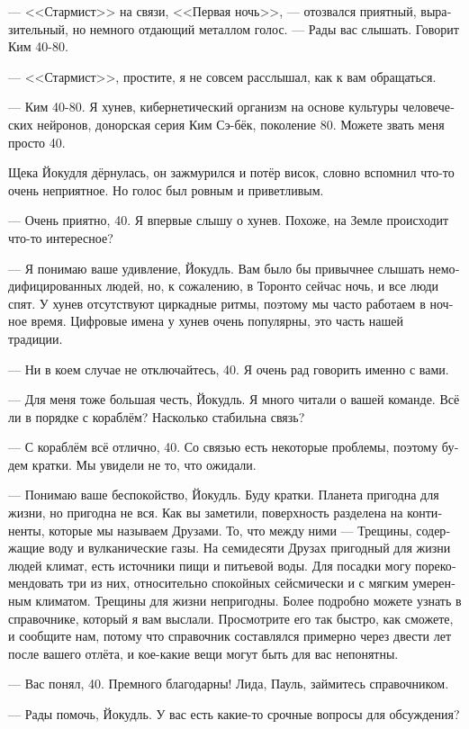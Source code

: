 \documentclass[a4paper,12pt,fleqn]{book}\usepackage{cooltooltips}\usepackage{polyglossia}\setdefaultlanguage[babelshorthands=true]{russian}\setotherlanguage{english}\defaultfontfeatures{Ligatures=TeX,Mapping=tex-text} \usepackage{xcolor}\definecolor{lightgray}{HTML}{bbbbbb}\color{lightgray}\newcommand{\ml}[3]{\textenglish{\textcolor{black}{#3}}}
\begin{document}
--- <<Стармист>> на связи, <<Первая ночь>>, --- отозвался приятный, выразительный, но немного отдающий металлом голос.
--- Рады вас слышать.
Говорит Ким 40-80.

--- <<Стармист>>, простите, я не совсем расслышал, как к вам обращаться.

--- Ким 40-80.
Я хунев, кибернетический организм на основе культуры человеческих нейронов, донорская серия Ким Сэ-бёк, поколение 80. %
Можете звать меня просто 40.

Щека Йокудля дёрнулась, он зажмурился и потёр висок, словно вспомнил что-то очень неприятное.
Но голос был ровным и приветливым.

--- Очень приятно, 40.
Я впервые слышу о хунев.
Похоже, на Земле происходит что-то интересное?

--- Я понимаю ваше удивление, Йокудль.
Вам было бы привычнее слышать немодифицированных людей, но, к сожалению, в Торонто сейчас ночь, и все люди спят.
У хунев отсутствуют циркадные ритмы, поэтому мы часто работаем в ночное время.
Цифровые имена у хунев очень популярны, это часть нашей традиции.

--- Ни в коем случае не отключайтесь, 40.
Я очень рад говорить именно с вами.

--- Для меня тоже большая честь, Йокудль.
Я много читали о вашей команде.
Всё ли в порядке с кораблём?
Насколько стабильна связь?

--- С кораблём всё отлично, 40.
Со связью есть некоторые проблемы, поэтому будем кратки.
Мы увидели не то, что ожидали.

--- Понимаю ваше беспокойство, Йокудль.
Буду кратки.
Планета пригодна для жизни, но пригодна не вся.
Как вы заметили, поверхность разделена на континенты, которые мы называем Друзами.
То, что между ними --- Трещины, содержащие воду и вулканические газы.
На семидесяти Друзах пригодный для жизни людей климат, есть источники пищи и питьевой воды.
Для посадки могу порекомендовать три из них, относительно спокойных сейсмически и с мягким умеренным климатом.
Трещины для жизни непригодны.
Более подробно можете узнать в справочнике, который я вам выслали.
Просмотрите его так быстро, как сможете, и сообщите нам, потому что справочник составлялся примерно через двести лет после вашего отлёта, и кое-какие вещи могут быть для вас непонятны.

--- Вас понял, 40.
Премного благодарны!
Лида, Пауль, займитесь справочником.

--- Рады помочь, Йокудль.
У вас есть какие-то срочные вопросы для обсуждения?
\end{document}
